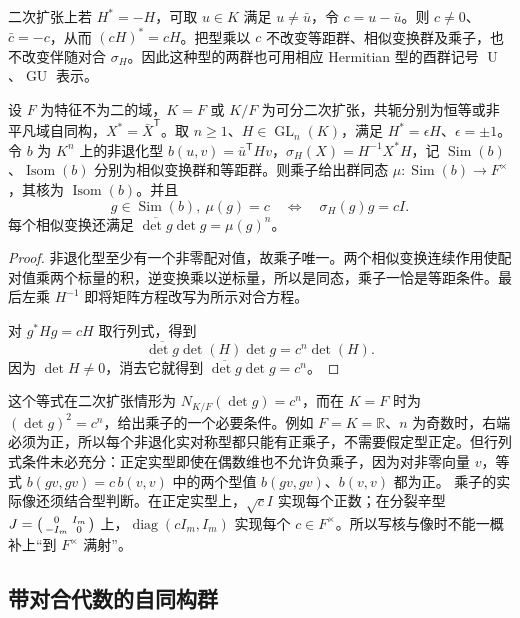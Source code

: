 二次扩张上若 \(H^*=-H\)，可取 \(u\in K\) 满足 \(u\ne\bar u\)，令 \(c=u-\bar u\)。则 \(c\ne0\)、\(\bar c=-c\)，从而 \((cH)^*=cH\)。把型乘以 \(c\) 不改变等距群、相似变换群及乘子，也不改变伴随对合 \(\sigma_H\)。因此这种型的两群也可用相应 Hermitian 型的酉群记号 \(\operatorname U\)、\(\operatorname{GU}\) 表示。
\begin{proposition}\label{b5:prop:classical-multiplier}
	设 \(F\) 为特征不为二的域，\(K=F\) 或 \(K/F\) 为可分二次扩张，共轭分别为恒等或非平凡域自同构，\(X^*=\bar X^{\mathsf T}\)。取 \(n\ge1\)、\(H\in\operatorname{GL}_n(K)\)，满足 \(H^*=\epsilon H\)、\(\epsilon=\pm1\)。令 \(b\) 为 \(K^n\) 上的非退化型 \(b(u,v)=\bar u^{\mathsf T}Hv\)，\(\sigma_H(X)=H^{-1}X^*H\)，记 \(\operatorname{Sim}(b)\)、\(\operatorname{Isom}(b)\) 分别为相似变换群和等距群。则乘子给出群同态 \(\mu:\operatorname{Sim}(b)\to F^\times\)，其核为 \(\operatorname{Isom}(b)\)。并且
	\[
		g\in\operatorname{Sim}(b),\ \mu(g)=c \quad\Longleftrightarrow\quad \sigma_H(g)g=cI.
	\]
	每个相似变换还满足 \(\overline{\det g}\det g=\mu(g)^n\)。
\end{proposition}
\begin{proof}
	非退化型至少有一个非零配对值，故乘子唯一。两个相似变换连续作用使配对值乘两个标量的积，逆变换乘以逆标量，所以是同态，乘子一恰是等距条件。最后左乘 \(H^{-1}\) 即将矩阵方程改写为所示对合方程。

	对 \(g^*Hg=cH\) 取行列式，得到
	\[
		\overline{\det g}\det(H)\det g=c^n\det(H).
	\]
	因为 \(\det H\ne0\)，消去它就得到 \(\overline{\det g}\det g=c^n\)。
\end{proof}
这个等式在二次扩张情形为 \(N_{K/F}(\det g)=c^n\)，而在 \(K=F\) 时为 \((\det g)^2=c^n\)，给出乘子的一个必要条件。例如 \(F=K=\mathbb R\)、\(n\) 为奇数时，右端必须为正，所以每个非退化实对称型都只能有正乘子，不需要假定型正定。但行列式条件未必充分：正定实型即使在偶数维也不允许负乘子，因为对非零向量 \(v\)，等式 \(b(gv,gv)=c\,b(v,v)\) 中的两个型值 \(b(gv,gv)\)、\(b(v,v)\) 都为正。
\ProseParagraphBreak
乘子的实际像还须结合型判断。在正定实型上，\(\sqrt c I\) 实现每个正数；在分裂辛型
\(J=\begin{psmallmatrix}0&I_m\\-I_m&0\end{psmallmatrix}\)
上，\(\operatorname{diag}(cI_m,I_m)\) 实现每个 \(c\in F^\times\)。所以写核与像时不能一概补上“到 \(F^\times\) 满射”。

\subsection{带对合代数的自同构群}
\label{b5:subsec:2105:02}


